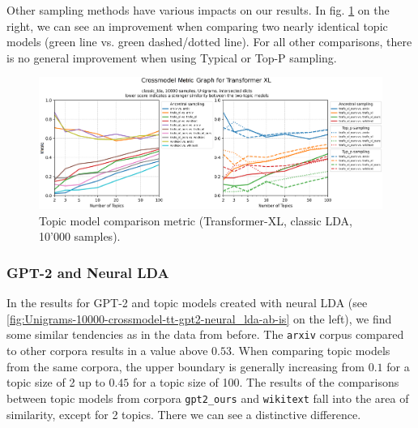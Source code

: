 Other sampling methods have various impacts on our results. In fig. \ref{fig:Unigrams-10000-crossmodel-tt-trafo_xl-classic_lda-ab-is} on the right, we can see an improvement when comparing two nearly identical topic models (green line vs. green dashed/dotted line). For all other comparisons, there is no general improvement when using Typical or Top-P sampling.
\begin{figure}[H]
    \centering
    \includegraphics[width=1\textwidth]{figures/Unigrams-10000-crossmodel-tt-trafo_xl-classic_lda-ab-is}
    \caption{Topic model comparison metric (Transformer-XL, classic LDA, 10'000 samples).}
    \label{fig:Unigrams-10000-crossmodel-tt-trafo_xl-classic_lda-ab-is}
\end{figure}

\subsubsection{GPT-2 and Neural LDA}
In the results for GPT-2 and topic models created with neural LDA (see \ref{fig:Unigrams-10000-crossmodel-tt-gpt2-neural_lda-ab-is} on the left), we find some similar tendencies as in the data from before. The \texttt{arxiv} corpus compared to other corpora results in a value above $0.53$. When comparing topic models from the same corpora, the upper boundary is generally increasing from $0.1$ for a topic size of 2 up to $0.45$ for a topic size of 100. The results of the comparisons between topic models from corpora \texttt{gpt2\_ours} and \texttt{wikitext} fall into the area of similarity, except for 2 topics. There we can see a distinctive difference.

